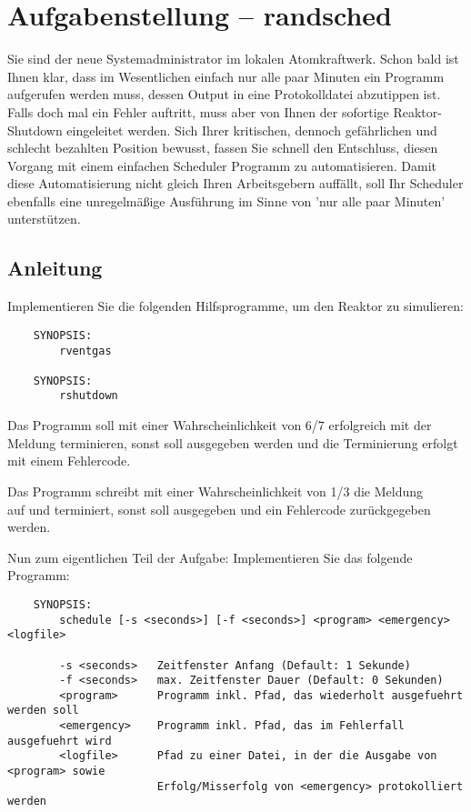 




\section*{Aufgabenstellung -- randsched}

Sie sind der neue Systemadministrator im lokalen Atomkraftwerk. Schon bald ist
Ihnen klar, dass im Wesentlichen einfach nur alle paar Minuten ein Programm
aufgerufen werden muss, dessen Output in eine Protokolldatei abzutippen ist.
Falls doch mal ein Fehler auftritt, muss aber von Ihnen der sofortige
Reaktor-Shutdown eingeleitet werden. Sich Ihrer kritischen, dennoch gefährlichen
und schlecht bezahlten Position bewusst, fassen Sie schnell den Entschluss,
diesen Vorgang mit einem einfachen Scheduler Programm zu automatisieren.
Damit diese Automatisierung nicht gleich Ihren Arbeitsgebern auff{\"a}llt, soll Ihr
Scheduler ebenfalls eine unregelm{\"a}{\ss}ige Ausf{\"u}hrung im Sinne von
'nur alle paar Minuten' unterst{\"u}tzen.

\subsection*{Anleitung}
Implementieren Sie die folgenden Hilfsprogramme, um den Reaktor zu simulieren:

\begin{verbatim}
    SYNOPSIS:
        rventgas

    SYNOPSIS:
        rshutdown
\end{verbatim}

Das Programm  soll mit einer Wahrscheinlichkeit von 6/7
erfolgreich mit der Meldung  terminieren, sonst soll
 ausgegeben werden
und die Terminierung erfolgt mit einem Fehlercode.

Das Programm  schreibt mit einer Wahrscheinlichkeit von 1/3
die Meldung\\
 auf  und terminiert, sonst
soll  ausgegeben und ein Fehlercode zurückgegeben werden.

Nun zum eigentlichen Teil der Aufgabe: Implementieren Sie das folgende Programm:

\begin{verbatim}
    SYNOPSIS:
        schedule [-s <seconds>] [-f <seconds>] <program> <emergency> <logfile>

        -s <seconds>   Zeitfenster Anfang (Default: 1 Sekunde)
        -f <seconds>   max. Zeitfenster Dauer (Default: 0 Sekunden)
        <program>      Programm inkl. Pfad, das wiederholt ausgefuehrt werden soll
        <emergency>    Programm inkl. Pfad, das im Fehlerfall ausgefuehrt wird
        <logfile>      Pfad zu einer Datei, in der die Ausgabe von <program> sowie
                       Erfolg/Misserfolg von <emergency> protokolliert werden
\end{verbatim}

